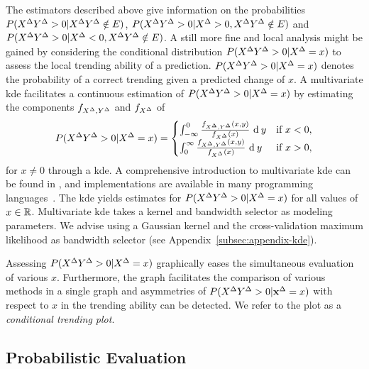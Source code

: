 The estimators described above give information on the probabilities $P(X^{\Delta} Y^{\Delta} > 0 | X^{\Delta} Y^{\Delta} \notin E)$, $P(X^{\Delta} Y^{\Delta} > 0 | X^{\Delta} > 0, X^{\Delta} Y^{\Delta} \notin E)$ and $P(X^{\Delta} Y^{\Delta} > 0 | X^{\Delta} < 0, X^{\Delta} Y^{\Delta} \notin E)$.
A still more fine and local analysis might be gained by considering the conditional distribution $P(X^{\Delta} Y^{\Delta} > 0 | X^{\Delta} = x)$ to assess the local trending ability of a prediction.
$P(X^{\Delta} Y^{\Delta} > 0 | X^{\Delta} = x)$ denotes the probability of a correct trending given a predicted change of $x$. 
A multivariate \acf{kde} facilitates a continuous estimation of $P(X^{\Delta} Y^{\Delta} > 0 | X^{\Delta} = x)$ by estimating the components $f_{X^{\Delta}, Y^{\Delta}}$ and $f_{X^{\Delta}}$ of
\begin{align*}
P(X^{\Delta} Y^{\Delta} > 0 | X^{\Delta} = x) = \begin{cases}
                                              \int_{-\infty}^0 \frac{f_{X^{\Delta}, Y^{\Delta}}(x, y)}{f_{X^{\Delta}}(x)} \ \textrm{d} \: y & \text{if } x < 0, \\
                                              \int_{0}^{\infty} \frac{f_{X^{\Delta}, Y^{\Delta}}(x, y)}{f_{X^{\Delta}}(x)} \ \textrm{d} \: y & \text{if } x > 0, \\
\end{cases}
\end{align*}
for $x \neq 0$ through a \ac{kde}.
A comprehensive introduction to multivariate \ac{kde} can be found in \textcite{Gramacki2018}, and implementations are available in many programming languages~\parencite[e.g., for  Python in][]{Seabold2010}.
The \ac{kde} yields estimates for $P(X^{\Delta} Y^{\Delta} > 0 | X^{\Delta} = x)$ for all values of $x \in \mathbb{R}$.
Multivariate \ac{kde} takes a kernel and bandwidth selector as modeling parameters. 
We advise using a Gaussian kernel and the cross-validation maximum likelihood as bandwidth selector (see Appendix~\ref{subsec:appendix-kde}).

Assessing $P(X^{\Delta} Y^{\Delta} > 0 | X^{\Delta} = x)$ graphically eases the simultaneous evaluation of various $x$.
Furthermore, the graph facilitates the comparison of various methods in a single graph and asymmetries of $P(X^{\Delta} Y^{\Delta} > 0 | \mathbf{x}^{\Delta} = x)$ with respect to $x$ in the trending ability can be detected.
We refer to the plot as a \textit{conditional trending plot}.



\subsection{Probabilistic Evaluation}\label{subsec:trending-probabilistic}

